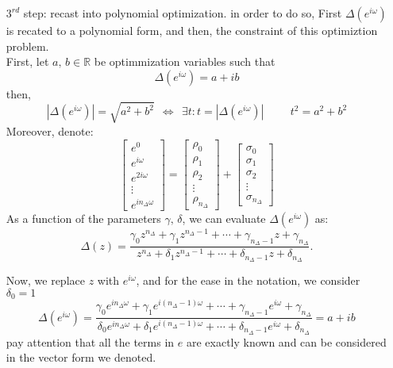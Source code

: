 \begin{enumerate}
        
        \item[$3^{rd}$ step:]  recast into polynomial optimization. in order to do so, First $\Delta(e^{i\omega})$ is recated to a polynomial form, and then, the constraint of this optimiztion problem. \\
        First, let $a,\,b \in \mathbb{R}$ be optimmization variables such that
        \[
        \Delta(e^{i\omega}) = a + i b
        \]
        then,
        \[
        |\Delta(e^{i\omega})| = \sqrt{a^2+b^2}\:\: \Longleftrightarrow \:\: \exists t: t=  |\Delta(e^{i\omega})|\hspace{1cm} t^2 = a^2 + b^2
        \]
        Moreover, denote:
        \[
        \begin{bmatrix}
            e^0\\
            e^{i \omega}\\
            e^{2i \omega}\\
            \vdots\\
            e^{in_\Delta \omega}
        \end{bmatrix}
        =
        \begin{bmatrix}
            \rho_0\\
            \rho_1\\
            \rho_2\\
            \vdots\\
            \rho_{n_\Delta}
        \end{bmatrix}
        +
           \begin{bmatrix}
            \sigma_0\\
            \sigma_1\\
            \sigma_2\\
            \vdots\\
            \sigma_{n_\Delta}
        \end{bmatrix}
        \]
As a function of the parameters \(\gamma,\,\delta\), we can evaluate \(\Delta(e^{i\omega})\) as:
\[
\Delta(z) = \frac{\gamma_0 z^{n_\Delta} + \gamma_1 z^{n_\Delta-1} + \cdots + \gamma_{n_\Delta-1} z + \gamma_{n_\Delta}}
{z^{n_\Delta} + \delta_1 z^{n_\Delta-1} + \cdots + \delta_{n_\Delta-1} z + \delta_{n_\Delta}}.
\]
    
    Now, we replace $z$ with $e^{i\omega}$, and for the ease in the notation, we consider $\delta_0 = 1$
    \[
\Delta(e^{i\omega}) = \frac{\gamma_0 e^{i n_\Delta \omega} + \gamma_1 e^{i (n_\Delta-1) \omega} + \cdots + \gamma_{n_\Delta-1} e^{i \omega} + \gamma_{n_\Delta}}
{\delta_0e^{i n_\Delta \omega} + \delta_1 e^{i (n_\Delta-1) \omega} + \cdots + \delta_{n_\Delta-1} e^{i \omega} + \delta_{n_\Delta}} = a + ib
\]
    pay attention that all the terms in $e$ are exactly known and can be considered in the vector form we denoted.


\end{enumerate}
